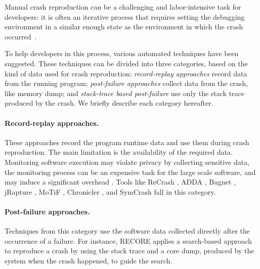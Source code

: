 Manual crash reproduction can be a challenging and labor-intensive task for developers: it is often an iterative process that requires setting the debugging environment in a similar enough state as the environment in which the crash occurred~\cite{Zeller2009}.

To help developers in this process, various automated techniques have been suggested.
These techniques can be divided into three categories, based on the kind of data used for crash reproduction: \emph{record-replay approaches} record data from the running program; \emph{post-failure approaches} collect data from the crash, like memory dump; and \emph{stack-trace based post-failure} use only the stack trace produced by the crash. We briefly describe each category hereafter.

\paragraph{Record-replay approaches.}

These approaches record the program runtime data and use them during crash reproduction. The main limitation is the availability of the required data. Monitoring software execution may violate privacy by collecting sensitive data, the monitoring process can be an expensive task for the large scale software, and may induce a significant overhead \cite{Chen2015, Nayrolles2017, Rossler2013}.
%
Tools like \textrm{ReCrash} \cite{Artzi2008}, \textrm{ADDA} \cite{Clause2007}, \textrm{Bugnet} \cite{Narayanasamy2005}, \textrm{jRapture} \cite{Steven2000}, \textrm{MoTiF} \cite{Gomez2016}, \textrm{Chronicler} \cite{Bell2013}, and \textrm{SymCrash} \cite{Cao2014} fall in this category.


\paragraph{Post-failure approaches.}

Techniques from this category use the software data collected directly after the occurrence of a failure. For instance, \textrm{RECORE} \cite{Rossler2013} applies a search-based approach to reproduce a crash by using the stack trace and a core dump, produced by the system when the crash happened, to guide the search.

